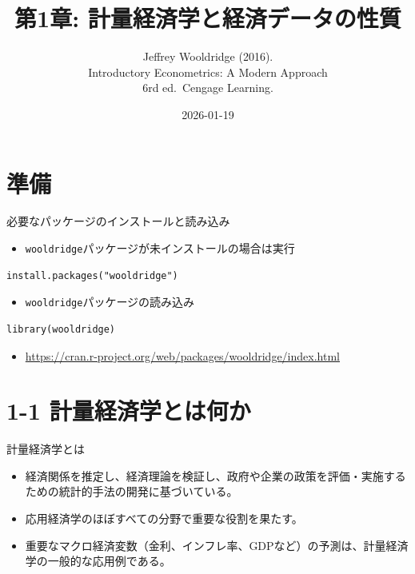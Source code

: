 \documentclass[
  ignorenonframetext,
]{beamer}
\title{第1章: 計量経済学と経済データの性質}
\subtitle{Jeffrey Wooldridge (2016).\\
Introductory Econometrics: A Modern Approach\\
6rd ed.~Cengage Learning.}
\author{}
\date{\vspace{-2.5em}2026-01-19}
\providecommand{\tightlist}{%
  \setlength{\itemsep}{0pt}\setlength{\parskip}{0pt}}
\begin{document}
\frame{\titlepage}

\section{準備}\label{ux6e96ux5099}

\begin{frame}[fragile]{必要なパッケージのインストールと読み込み}
\label{ux5fc5ux8981ux306aux30d1ux30c3ux30b1ux30fcux30b8ux306eux30a4ux30f3ux30b9ux30c8ux30fcux30ebux3068ux8aadux307fux8fbcux307f}
\begin{itemize}
\tightlist
\item
  \texttt{wooldridge}パッケージが未インストールの場合は実行
\end{itemize}

\begin{verbatim}
install.packages("wooldridge")
\end{verbatim}

\begin{itemize}
\tightlist
\item
  \texttt{wooldridge}パッケージの読み込み
\end{itemize}

\begin{verbatim}
library(wooldridge)
\end{verbatim}

\begin{itemize}
\tightlist
\item
  \url{https://cran.r-project.org/web/packages/wooldridge/index.html}
\end{itemize}
\end{frame}

\section{1-1
計量経済学とは何か}\label{ux8a08ux91cfux7d4cux6e08ux5b66ux3068ux306fux4f55ux304b}

\begin{frame}{計量経済学とは}
\label{ux8a08ux91cfux7d4cux6e08ux5b66ux3068ux306f}
\begin{itemize}
\tightlist
\item
  経済関係を推定し、経済理論を検証し、政府や企業の政策を評価・実施するための統計的手法の開発に基づいている。
\item
  応用経済学のほぼすべての分野で重要な役割を果たす。
\item
  重要なマクロ経済変数（金利、インフレ率、GDPなど）の予測は、計量経済学の一般的な応用例である。
\end{itemize}
\end{frame}
\end{document}
